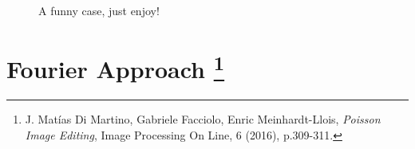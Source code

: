 \documentclass[11pt]{article}
\begin{document}
\begin{figure}[H]
		\caption{A funny case, just enjoy!}
	\end{figure}
	
\section[Fourier Approach]{Fourier Approach \footnote[3]{J. Mat\'ias Di Martino, Gabriele Facciolo, Enric Meinhardt-Llois, \textit{Poisson Image Editing}, Image Processing On Line, 6 (2016), p.309-311.}}
	
\end{document}
